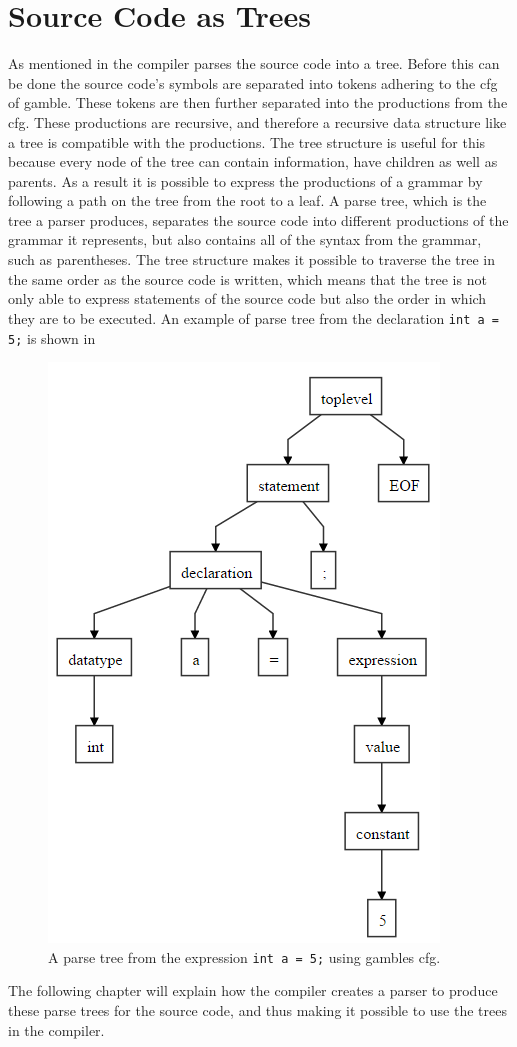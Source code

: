 \section{Source Code as Trees}\label{SourceCodeAsTrees}
As mentioned in  the compiler parses the source code into a tree.
Before this can be done the source code's symbols are separated into tokens adhering to the \acrshort{cfg} of \gls{gamble}.
These tokens are then further separated into the productions from the \acrshort{cfg}. 
These productions are recursive, and therefore a recursive data structure like a tree is compatible with the productions.
The tree structure is useful for this because every node of the tree can contain information, have children as well as parents. 
As a result it is possible to express the productions of a grammar by following a path on the tree from the root to a leaf.
A parse tree, which is the tree a parser produces, separates the source code into different productions of the grammar it represents, but also contains all of the syntax from the grammar, such as parentheses.
The tree structure makes it possible to traverse the tree in the same order as the source code is written, which means that the tree is not only able to express statements of the source code but also the order in which they are to be executed.
An example of parse tree from the declaration \texttt{int a = 5;} is shown in 

\begin{figure}
    \centering
    \includegraphics[width=0.5\linewidth]{figures/Trees/PST.PNG}
    \caption{A parse tree from the expression \texttt{int a = 5;} using \glspl{gamble} \acrshort{cfg}.}\label{image:PST}
\end{figure}

The following chapter will explain how the compiler creates a parser to produce these parse trees for the source code, and thus making it possible to use the trees in the compiler.
